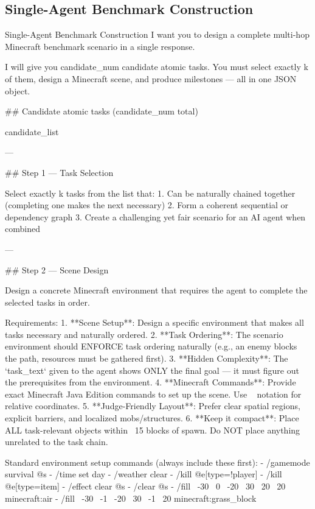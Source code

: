 \documentclass[11pt]{article}
\begin{document}
\subsection{Single-Agent Benchmark Construction}
\label{appendix: Single-Agent Benchmark Construction}
\begin{center}
\centering
\begin{widepromptbox}{Single-Agent Benchmark Construction}
I want you to design a complete multi-hop Minecraft benchmark scenario in a single response.

I will give you {candidate_num} candidate atomic tasks. You must select exactly {k} of them, design a Minecraft scene, and produce milestones — all in one JSON object.

## Candidate atomic tasks ({candidate_num} total)

{candidate_list}

---

## Step 1 — Task Selection

Select exactly {k} tasks from the list that:
1. Can be naturally chained together (completing one makes the next necessary)
2. Form a coherent sequential or dependency graph
3. Create a challenging yet fair scenario for an AI agent when combined

---

## Step 2 — Scene Design

Design a concrete Minecraft environment that requires the agent to complete the selected tasks in order.

Requirements:
1. **Scene Setup**: Design a specific environment that makes all tasks necessary and naturally ordered.
2. **Task Ordering**: The scenario environment should ENFORCE task ordering naturally (e.g., an enemy blocks the path, resources must be gathered first).
3. **Hidden Complexity**: The `task_text` given to the agent shows ONLY the final goal — it must figure out the prerequisites from the environment.
4. **Minecraft Commands**: Provide exact Minecraft Java Edition commands to set up the scene. Use ~ notation for relative coordinates.
5. **Judge-Friendly Layout**: Prefer clear spatial regions, explicit barriers, and localized mobs/structures.
6. **Keep it compact**: Place ALL task-relevant objects within ~15 blocks of spawn. Do NOT place anything unrelated to the task chain.

Standard environment setup commands (always include these first):
- /gamemode survival @s
- /time set day
- /weather clear
- /kill @e[type=!player]
- /kill @e[type=item]
- /effect clear @s
- /clear @s
- /fill ~-30 ~0 ~-20 ~30 ~20 ~20 minecraft:air
- /fill ~-30 ~-1 ~-20 ~30 ~-1 ~20 minecraft:grass_block


\end{widepromptbox}
\end{center}
\end{document}
